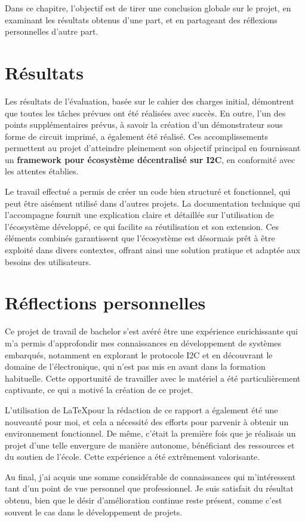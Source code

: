 Dans ce chapitre, l'objectif est de tirer une conclusion globale sur le projet, en examinant les résultats obtenus d'une part, et en partageant des réflexions personnelles d'autre part.

\section{Résultats}

Les résultats de l'évaluation, basée sur le cahier des charges initial, démontrent que toutes les tâches prévues ont été réalisées avec succès.
En outre, l'un des points supplémentaires prévus, à savoir la création d'un démonstrateur sous forme de circuit imprimé, a également été réalisé.
Ces accomplissements permettent au projet d'atteindre pleinement son objectif principal en fournissant un \textbf{framework pour écosystème décentralisé sur I2C}, en conformité avec les attentes établies.

Le travail effectué a permis de créer un code bien structuré et fonctionnel, qui peut être aisément utilisé dans d'autres projets.
La documentation technique qui l'accompagne fournit une explication claire et détaillée sur l'utilisation de l'écosystème développé, ce qui facilite sa réutilisation et son extension.
Ces éléments combinés garantissent que l'écosystème est désormais prêt à être exploité dans divers contextes, offrant ainsi une solution pratique et adaptée aux besoins des utilisateurs.

\section{Réflections personnelles}

Ce projet de travail de bachelor s'est avéré être une expérience enrichissante qui m'a permis d'approfondir mes connaissances en développement de systèmes embarqués, notamment en explorant le protocole I2C et en découvrant le domaine de l'électronique, qui n'est pas mis en avant dans la formation habituelle.
Cette opportunité de travailler avec le matériel a été particulièrement captivante, ce qui a motivé la création de ce projet.

L'utilisation de \LaTeX pour la rédaction de ce rapport a également été une nouveauté pour moi, et cela a nécessité des efforts pour parvenir à obtenir un environnement fonctionnel.
De même, c'était la première fois que je réalisais un projet d'une telle envergure de manière autonome, bénéficiant des ressources et du soutien de l'école.
Cette expérience a été extrêmement valorisante.

Au final, j'ai acquis une somme considérable de connaissances qui m'intéressent tant d'un point de vue personnel que professionnel.
Je suis satisfait du résultat obtenu, bien que le désir d'amélioration continue reste présent, comme c'est souvent le cas dans le développement de projets.


\vfil
\hspace{8cm}\makeatletter\@author\makeatother\par
\hspace{8cm}\begin{minipage}{5cm}
    \printsignature
\end{minipage}
\clearpage